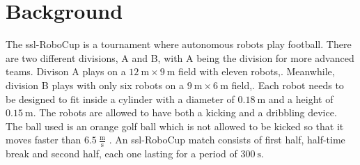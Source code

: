 \section{Background}
\label{section:background}

The \ac{ssl}-RoboCup is a tournament where autonomous robots play football\:\cite{da_silva_costa_multi-robot_2024}. There are two different divisions, A and B, with A being the division for more advanced teams\:\cite{noauthor_rules_2024}. Divison A plays on a $12\:\text{m} \times 9\:\text{m}$ field with eleven robots\:\cite{da_silva_costa_multi-robot_2024},\cite{noauthor_rules_2024}. Meanwhile, division B plays with only six robots on a $9\:\text{m} \times 6\:\text{m}$ field\:\cite{da_silva_costa_multi-robot_2024},\cite{noauthor_rules_2024}. 
Each robot needs to be designed to fit inside a cylinder with a diameter of $0.18\:\text{m}$ and a height of $0.15\:\text{m}$\:\cite{noauthor_rules_2024}. The robots are allowed to have both a kicking and a dribbling device\:\cite{noauthor_rules_2024}. The ball used is an orange golf ball which is not allowed to be kicked so that it moves faster than $6.5\:\frac{\text{m}}{\text{s}}$ \cite{noauthor_rules_2024}. 
An \ac{ssl}-RoboCup match consists of first half, half-time break and second half, each one lasting for a period of $300\:\text{s}$\:\cite{noauthor_rules_2024}.



